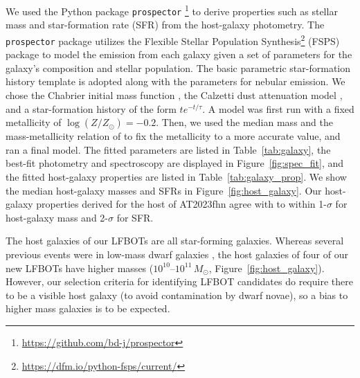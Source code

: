 \documentclass[twocolumn,twocolappendix, linenumbers, trackchanges]{aastex7}
\begin{document}
We used the Python package \texttt{prospector} \citep{prospector1, prospector2}\footnote{\url{https://github.com/bd-j/prospector}} to derive properties such as stellar mass and star-formation rate (SFR) from the host-galaxy photometry.  The \texttt{prospector} package utilizes the Flexible Stellar Population Synthesis\footnote{\href{https://dfm.io/python-fsps/current/}{https://dfm.io/python-fsps/current/}} (FSPS) package to model the emission from each galaxy given a set of parameters for the galaxy's composition and stellar population.   The basic parametric star-formation history template is adopted along with the parameters for nebular emission.  We chose the Chabrier initial mass function \citep{chabrier2003}, the Calzetti dust attenuation model \citep{calzetti2000}, and a star-formation history of the form $t e^{-t/\tau}$.   A model was first run with a fixed metallicity of $\log (Z/Z_{\odot})=-0.2$.  Then, we used the median mass and the mass-metallicity relation of \citet{gallazzi2005} to fix the metallicity to a more accurate value, and ran a final model.
The fitted parameters are listed in Table~\ref{tab:galaxy}, the best-fit photometry and spectroscopy are displayed in Figure~\ref{fig:spec_fit}, and the fitted host-galaxy properties are listed in Table~\ref{tab:galaxy_prop}.  We show the median host-galaxy masses and SFRs in Figure~\ref{fig:host_galaxy}.  Our host-galaxy properties derived for the host of AT2023fhn agree with \citet{chrimes2024} to within 1-$\sigma$ for  host-galaxy mass and 2-$\sigma$ for  SFR. 

The host galaxies of our LFBOTs are all star-forming galaxies. Whereas several previous events were in low-mass dwarf galaxies \citep{ho2020koala, coppejans2020,chrimesfhn,margutti}, the host galaxies of four of our new LFBOTs have higher masses ($10^{10}$--$10^{11}\,M_{\odot}$, Figure~\ref{fig:host_galaxy}). However, our selection criteria for identifying LFBOT candidates do require there to be a visible host galaxy (to avoid contamination by dwarf novae), so a bias to higher mass galaxies  is to be expected. 
\end{document}

